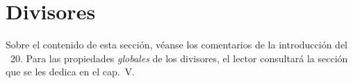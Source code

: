 \section{Divisores}
\label{section:IV.21}

Sobre el contenido de esta sección, véanse los comentarios de la introducción del \textsection~20.
Para las propiedades \emph{globales} de los divisores, el lector consultará la sección que se les dedica en el cap.~V.
